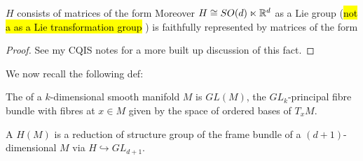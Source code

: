 \documentclass{article}
\begin{document}
\begin{prop}
	$H$ consists of matrices of the form 
Moreover $H \cong SO(d)\ltimes \mathbb{R}^d$ as a Lie group (\hl{not a as a Lie transformation group} \cite{Kunzle1972} ) is faithfully represented by matrices of the form 
\end{prop}
\begin{proof}
	See my CQIS notes for a more built up discussion of this fact. 
\end{proof}

We now recall the following def:

\begin{definition}
	The  of a $k$-dimensional smooth manifold $M$ is $GL(M)$, the $GL_k$-principal fibre bundle with fibres at $x \in M$ given by the space of ordered bases of $T_xM$. 
\end{definition}

\begin{definition}
	A  $H(M)$ is a reduction of structure group of the frame bundle of a $(d+1)$-dimensional $M$ via $H \hookrightarrow GL_{d+1} $.
\end{definition}





\end{document}
